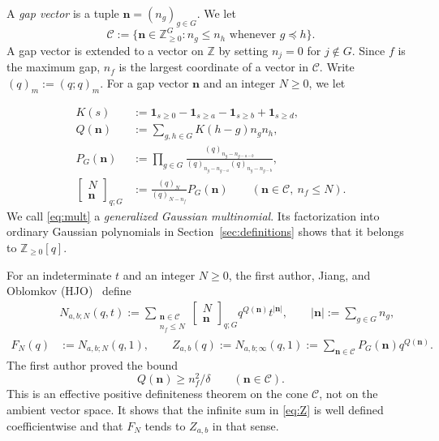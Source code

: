 \documentclass[12pt,reqno]{amsart}
\numberwithin{equation}{section}
\theoremstyle{definition}
\theoremstyle{remark}
\theoremstyle{plain}
\newcommand{\NN}{\mathbb Z_{\ge0}}
\newcommand{\ZZ}{\mathbb Z}
\newcommand{\one}{\mathbf1}
\newcommand{\nn}{\mathbf n}
\newcommand{\mult}[2]{\left[\begin{matrix}#1\\#2\end{matrix}\right]_{q;G}}
\begin{document}
A {\it gap vector} is a tuple $\nn=(n_g)_{g\in G}$. We let
\[
 \mathcal C:=\{\nn\in\NN^G:n_g\le n_h\text{ whenever }g\preceq h\}.
\]
A gap vector is extended to a vector on $\ZZ$ by setting $n_j=0$ for $j\not \in G$. Since $f$ is the maximum gap, $n_f$ is the largest coordinate of
a vector in $\mathcal C$.  Write $(q)_m:=(q;q)_m$.  For a gap vector $\nn$ and an integer $N\ge0$, we let

\begin{align}
 K(s)&:=\one_{s\ge0}-\one_{s\ge a}-\one_{s\ge b}+\one_{s\ge d},\label{eq:K}\\
 Q(\nn)&:=\sum_{g,h\in G}K(h-g)n_gn_h,\label{eq:Q}\\
 P_G(\nn)&:=\prod_{g\in G}
 \frac{(q)_{n_g-n_{g-a-b}}}{(q)_{n_g-n_{g-a}}(q)_{n_g-n_{g-b}}},\label{eq:PG}\\
 \mult N\nn&:=\frac{(q)_N}{(q)_{N-n_f}}P_G(\nn)
 \qquad(\nn\in\mathcal C,\ n_f\le N).\label{eq:mult}
\end{align}
We call \eqref{eq:mult} a \emph{generalized Gaussian multinomial}.
Its factorization into ordinary Gaussian polynomials in
Section~\ref{sec:definitions} shows that it belongs to $\NN[q]$.



For an indeterminate $t$ and an integer $N\ge0$, the first author, Jiang, and Oblomkov (HJO)~
\cite[(2.1)--(2.5)]{HJO} define
\begin{align}
 &N_{a,b;N}(q,t)
:=\sum_{\substack{\nn\in\mathcal C\\n_f\le N}}
       \mult N\nn q^{Q(\nn)}t^{|\nn|},
       \qquad |\nn|:=\sum_{g\in G}n_g,\label{eq:HN}\\
 F_N(q)&:=N_{a,b;N}(q,1),\qquad
 Z_{a,b}(q):=N_{a,b;\infty}(q,1):=\sum_{\nn\in\mathcal C}P_G(\nn)q^{Q(\nn)}.
 \label{eq:Z}
\end{align}
The first author proved the bound~\cite[Theorem~1.3]{Huang}
\begin{equation}\label{eq:coercivity}
 Q(\nn)\ge n_f^2/\delta\qquad(\nn\in\mathcal C).
\end{equation}
This is an effective positive definiteness theorem on the cone $\mathcal C$, not on the ambient vector space.
It shows that the infinite sum in \eqref{eq:Z} is well defined coefficientwise and that $F_N$ tends to $Z_{a,b}$ in that sense.
\end{document}
